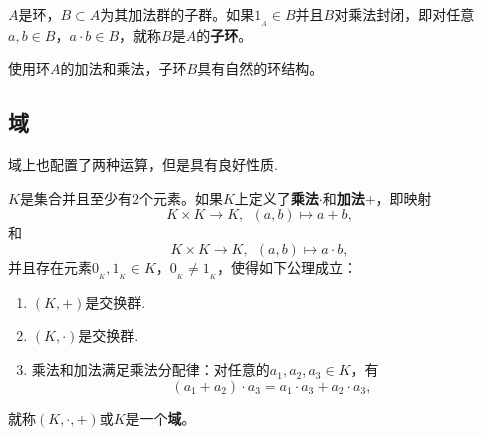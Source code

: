 \documentclass[lang=cn,10pt]{elegantbook}
\begin{document}
	\begin{definition}[子环]
		$A$是环，$B\subset A$为其加法群的子群。如果$1_{_A}\in B$并且$B$对乘法封闭，即对任意$a,b\in B$，$a\cdot b\in B$，就称$B$是$A$的{\bf 子环}。
		
		使用环$A$的加法和乘法，子环$B$具有自然的环结构。
		
	\end{definition}
	
	\subsection{域}
	域上也配置了两种运算，但是具有良好性质.
	\begin{definition}[域]
		$K$是集合并且至少有$2$个元素。如果$K$上定义了{\bf 乘法}$\cdot$和{\bf 加法}$+$，即映射
		\[K\times K\rightarrow K,  \ \ (a,b)\mapsto a+ b,\]
		和
		\[K\times K\rightarrow K,  \ \ (a,b)\mapsto a\cdot b,\]
		并且存在元素$0_{_K}, 1_{_K}\in K$，$0_{_K}\neq 1_{_K}$，使得如下公理成立：
		\begin{enumerate}
			\item \((K,+)\)是交换群.
			\item
				\((K,\cdot)\)是交换群.
			\item 乘法和加法满足乘法分配律：对任意的$a_1,a_2,a_3\in K$，有
			\[(a_1+ a_2)\cdot a_3=a_1\cdot a_3 +a_2\cdot a_3,\]
		\end{enumerate}
		就称$(K,\cdot,+)$或$K$是一个{\bf 域}。
	\end{definition}
\end{document}
